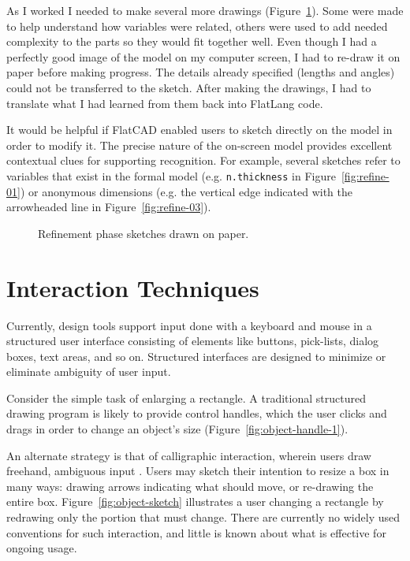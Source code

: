 \documentclass[times, 10pt, twocolumn]{article}
\begin{document}
As I worked I needed to make several more drawings
(Figure~\ref{fig:refine}). Some were made to help understand how
variables were related, others were used to add needed complexity to
the parts so they would fit together well. Even though I had a
perfectly good image of the model on my computer screen, I had to
re-draw it on paper before making progress. The details already
specified (lengths and angles) could not be transferred to the
sketch. After making the drawings, I had to translate what I had
learned from them back into FlatLang code.

It would be helpful if FlatCAD enabled users to sketch directly on the
model in order to modify it. The precise nature of the on-screen model
provides excellent contextual clues for supporting recognition. For
example, several sketches refer to variables that exist in the formal
model (e.g. \texttt{n.thickness} in Figure~\ref{fig:refine-01}) or
anonymous dimensions (e.g. the vertical edge indicated with the
arrowheaded line in Figure~\ref{fig:refine-03}).


\begin{figure}
  \centering
  \caption{Refinement phase sketches drawn on paper.}
  \label{fig:refine}
\end{figure}



\section{Interaction Techniques}

Currently, design tools support input done with a keyboard and mouse
in a structured user interface consisting of elements like buttons,
pick-lists, dialog boxes, text areas, and so on. Structured interfaces
are designed to minimize or eliminate ambiguity of user input.

Consider the simple task of enlarging a rectangle. A traditional
structured drawing program is likely to provide control handles, which
the user clicks and drags in order to change an object's size
(Figure~\ref{fig:object-handle-1}).

An alternate strategy is that of calligraphic interaction, wherein
users draw freehand, ambiguous input
\cite{jorge-calligraphic-introduction}. Users may sketch their
intention to resize a box in many ways: drawing arrows indicating what
should move, or re-drawing the entire
box. Figure~\ref{fig:object-sketch} illustrates a user changing a
rectangle by redrawing only the portion that must change. There are
currently no widely used conventions for such interaction, and little
is known about what is effective for ongoing usage.
\end{document}
